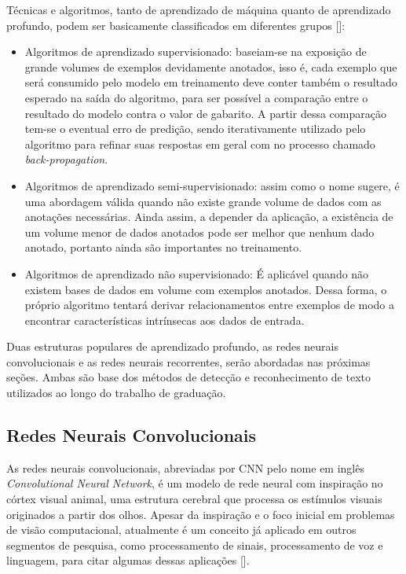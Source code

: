 Técnicas e algoritmos, tanto de aprendizado de máquina quanto de aprendizado profundo, podem ser basicamente classificados 
em diferentes grupos []:

\begin{itemize}
    \item Algoritmos de aprendizado supervisionado: baseiam-se na exposição de grande volumes de exemplos devidamente anotados, 
    isso é, cada exemplo que será consumido pelo modelo em treinamento deve conter também o resultado esperado na saída do algoritmo, 
    para ser possível a comparação entre o resultado do modelo contra o valor de gabarito. A partir dessa comparação tem-se o eventual 
    erro de predição, sendo iterativamente utilizado pelo algoritmo para refinar suas respostas em geral com no processo chamado \textit{back-propagation}.

    \item Algoritmos de aprendizado semi-supervisionado: assim como o nome sugere, é uma abordagem válida quando não existe grande 
    volume de dados com as anotações necessárias. Ainda assim, a depender da aplicação, a existência de um volume menor de dados 
    anotados pode ser melhor que nenhum dado anotado, portanto ainda são importantes no treinamento.

    \item Algoritmos de aprendizado não supervisionado: É aplicável quando não existem bases de dados em volume com exemplos anotados. 
    Dessa forma, o próprio algoritmo tentará derivar relacionamentos entre exemplos de modo a encontrar características intrínsecas aos dados de entrada.
\end{itemize}

Duas estruturas populares de aprendizado profundo, as redes neurais convolucionais e as redes neurais recorrentes, serão 
abordadas nas próximas seções. Ambas são base dos métodos de detecção e reconhecimento de texto utilizados ao longo do trabalho de graduação.


\subsection{Redes Neurais Convolucionais}
As redes neurais convolucionais, abreviadas por CNN pelo nome em inglês \textit{Convolutional Neural Network}, é um modelo de rede neural 
com inspiração no córtex visual animal, uma estrutura cerebral que processa os estímulos visuais originados a partir dos olhos. Apesar da 
inspiração e o foco inicial em problemas de visão computacional, atualmente é um conceito já aplicado em outros segmentos de pesquisa, 
como processamento de sinais, processamento de voz e linguagem, para citar algumas dessas aplicações [].

